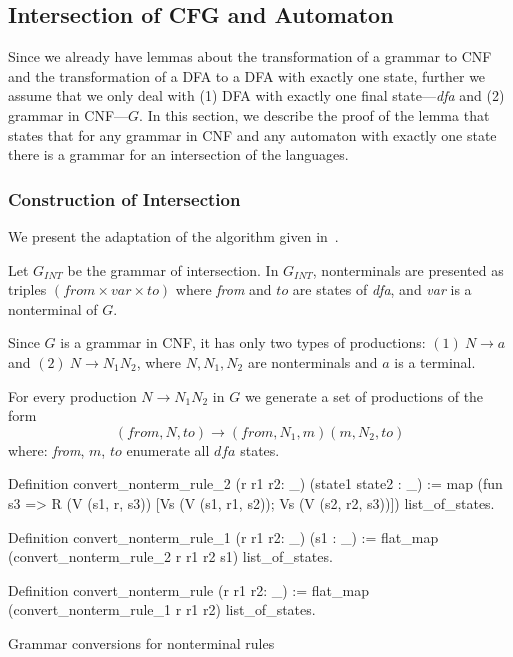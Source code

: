 \subsection{Intersection of CFG and Automaton}

Since we already have lemmas about the transformation of a grammar to CNF and the transformation of a DFA to a DFA with exactly one state, further we assume that we only deal with (1) DFA with exactly one final state---\textit{dfa} and (2) grammar in CNF---$G$. In this section, we describe the proof of the lemma that states that for any grammar in CNF and any automaton with exactly one state there is a grammar for an intersection of the languages.

\subsubsection{Construction of Intersection}

We present the adaptation of the algorithm given in~\cite{beigelproof}. 

Let $G_{INT}$ be the grammar of intersection. In $G_{INT}$, nonterminals are presented as triples $(\textit{from} \times var \times to) $ where \textit{from} and $to$ are states of \textit{dfa}, and \textit{var} is a nonterminal of $G$.

Since $G$ is a grammar in CNF, it has only two types of productions: $(1)\ N \to a $ and $(2) \ N \to N_{1} N_{2}$, where $N, N_1, N_2$ are nonterminals and $a$ is a terminal.

For every production $N \to N_1 N_2$ in $G$ we generate a set of productions of the form $$(\textit{from}, N, to) \to (\textit{from}, N_1,  m) (m, N_2, to)$$ where: \textit{from}, $m$, $to$ enumerate all $\textit{dfa}$ states.

\begin{listing}[h]
    \begin{pyglist}[language=coq, numbers=none, numbersep=5pt]
  Definition convert_nonterm_rule_2 
    (r r1 r2: _) 
    (state1 state2 : _) :=
    map (fun s3 => R (V (s1, r, s3)) 
                     [Vs (V (s1, r1, s2)); 
                      Vs (V (s2, r2, s3))])
      list_of_states.

  Definition convert_nonterm_rule_1  
               (r r1 r2: _) 
               (s1 : _) :=
    flat_map (convert_nonterm_rule_2 r r1 r2 s1) 
             list_of_states.

  Definition convert_nonterm_rule (r r1 r2: _) :=
    flat_map (convert_nonterm_rule_1 r r1 r2) 
             list_of_states.
    \end{pyglist}
    \caption{Grammar conversions for nonterminal rules}
    \label{lst:verbments1}
\end{listing}

